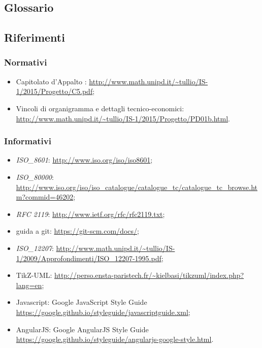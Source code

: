 \documentclass[12pt,a4paper]{article}
\begin{document}
\subsection{Glossario}\label{glossario}
\glossarioPrint

\subsection{Riferimenti}\label{riferimenti}

\subsubsection{Normativi}
\begin{itemize}
	\item Capitolato d’Appalto \prjL: \url{http://www.math.unipd.it/~tullio/IS-1/2015/Progetto/C5.pdf};
	\item Vincoli di organigramma e dettagli tecnico-economici: \url{http://www.math.unipd.it/~tullio/IS-1/2015/Progetto/PD01b.html}.
\end{itemize}

\subsubsection{Informativi}
\begin{itemize}
	\item \textit{ISO\_8601}: \url{http://www.iso.org/iso/iso8601};
	\item \textit{ISO\_80000}: \url{http://www.iso.org/iso/iso_catalogue/catalogue_tc/catalogue_tc_browse.htm?commid=46202};
	\item \textit{RFC 2119}: {\url{http://www.ietf.org/rfc/rfc2119.txt}};
	\item guida a git: \url{https://git-scm.com/docs/};
	\item \textit{ISO\_12207}: \url{http://www.math.unipd.it/~tullio/IS-1/2009/Approfondimenti/ISO_12207-1995.pdf};
	\item TikZ-UML: \url{http://perso.ensta-paristech.fr/~kielbasi/tikzuml/index.php?lang=en};
	\item Javascript: Google JavaScript Style Guide \url{https://google.github.io/styleguide/javascriptguide.xml};
	\item AngularJS: Google AngularJS Style Guide \url{https://google.github.io/styleguide/angularjs-google-style.html}.
\end{itemize}

\newpage
\end{document}
